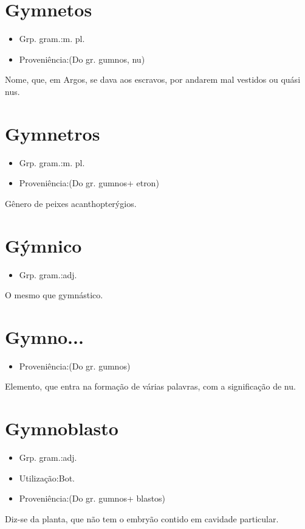 \section{Gymnetos}
\begin{itemize}
\item {Grp. gram.:m. pl.}
\end{itemize}
\begin{itemize}
\item {Proveniência:(Do gr. \textunderscore gumnos\textunderscore , nu)}
\end{itemize}
Nome, que, em Argos, se dava aos escravos, por andarem mal vestidos ou quási nus.
\section{Gymnetros}
\begin{itemize}
\item {Grp. gram.:m. pl.}
\end{itemize}
\begin{itemize}
\item {Proveniência:(Do gr. \textunderscore gumnos\textunderscore  + \textunderscore etron\textunderscore )}
\end{itemize}
Gênero de peixes acanthopterýgios.
\section{Gýmnico}
\begin{itemize}
\item {Grp. gram.:adj.}
\end{itemize}
O mesmo que \textunderscore gymnástico\textunderscore .
\section{Gymno...}
\begin{itemize}
\item {Proveniência:(Do gr. \textunderscore gumnos\textunderscore )}
\end{itemize}
Elemento, que entra na formação de várias palavras, com a significação de \textunderscore nu\textunderscore .
\section{Gymnoblasto}
\begin{itemize}
\item {Grp. gram.:adj.}
\end{itemize}
\begin{itemize}
\item {Utilização:Bot.}
\end{itemize}
\begin{itemize}
\item {Proveniência:(Do gr. \textunderscore gumnos\textunderscore  + \textunderscore blastos\textunderscore )}
\end{itemize}
Diz-se da planta, que não tem o embryão contido em cavidade particular.
